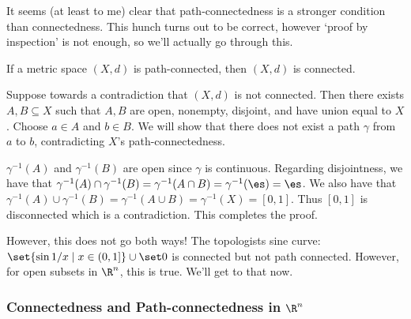\documentclass[class=article, crop=false]{standalone}
\begin{document}
It seems (at least to me) clear that path-connectedness is a stronger condition than connectedness. This hunch turns out to be correct, however `proof by inspection' is not enough, so we'll actually go through this.

\begin{thm}{\label{thm:pathconimpliescon}}
    If a metric space $(X,d)$ is path-connected, then $(X,d)$ is connected.
\end{thm}
\begin{pf}
    Suppose towards a contradiction that $(X,d)$ is not connected. Then there exists $A,B \subseteq X$ such that $A,B$ are open, nonempty, disjoint, and have union equal to $X$. Choose $a \in A$ and $b \in B$. We will show that there does not exist a path $\gamma$ from $a$ to $b$, contradicting $X$'s path-connectedness.

    $\gamma^{-1}(A)$ and $\gamma^{-1}(B)$ are open since $\gamma$ is continuous. Regarding disjointness, we have that $\gamma^{-1}(A) \cap \gamma^{-1}(B) = \gamma^{-1}(A \cap B) = \gamma^{-1}(\es) = \es$. We also have that $\gamma^{-1}(A) \cup \gamma^{-1}(B) = \gamma^{-1}(A \cup B) = \gamma^{-1}(X) = [0,1]$.
    Thus $[0,1]$ is disconnected which is a contradiction. This completes the proof.
\end{pf}

However, this does not go both ways! The topologists sine curve: $\set{\sin 1/x \mid x \in (0,1]} \cup \set 0$ is connected but not path connected. However, for open subsets in $\R^n$, this is true. We'll get to that now.



\subsubsection*{Connectedness and Path-connectedness in $\R^n$}
\end{document}
